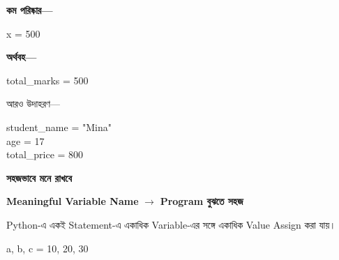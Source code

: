 \textbf{কম পরিষ্কার—}

\begin{codebox}

\begin{english}
\ttfamily
x = 500
\end{english}

\end{codebox}

\textbf{অর্থবহ—}

\begin{codebox}

\begin{english}
\ttfamily
total\_marks = 500
\end{english}

\end{codebox}

আরও উদাহরণ—

\begin{codebox}

\begin{english}
\ttfamily
student\_name = "Mina"\\
age = 17\\
total\_price = 800
\end{english}

\end{codebox}

\begin{rememberbox}

\textbf{\color{deepOrange}সহজভাবে মনে রাখবে}

\begin{center}

\textbf{Meaningful Variable Name}
\(\longrightarrow\)
\textbf{Program বুঝতে সহজ}

\end{center}

\end{rememberbox}



Python-এ একই Statement-এ একাধিক Variable-এর সঙ্গে
একাধিক Value Assign করা যায়।

\begin{codebox}

\begin{english}
\ttfamily
a, b, c = 10, 20, 30
\end{english}

\end{codebox}

